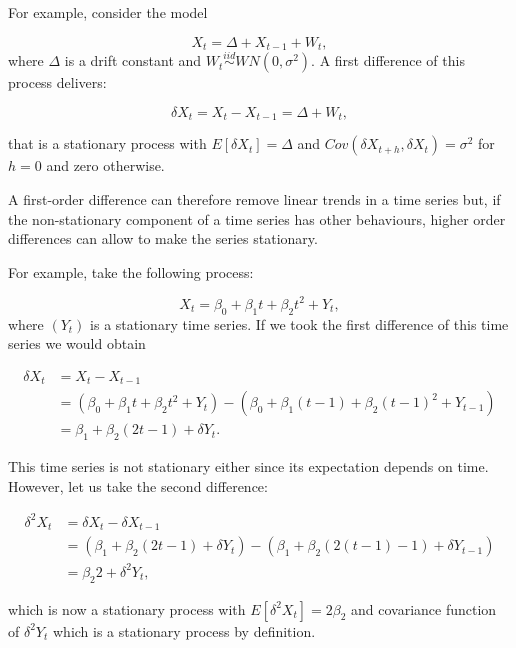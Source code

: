 \documentclass[]{book}
\theoremstyle{definition}
\theoremstyle{definition}
\theoremstyle{definition}
\theoremstyle{remark}
\let\BeginKnitrBlock\begin \let\EndKnitrBlock\end
\begin{document}
\BeginKnitrBlock{example}
\protect\hypertarget{exm:unnamed-chunk-91}{}{\label{exm:unnamed-chunk-91}
}For example, consider the model

\[X_t = \Delta + X_{t-1} + W_t,\] where \(\Delta\) is a drift constant
and \(W_t \overset{iid}{\sim} WN(0, \sigma^2)\). A first difference of
this process delivers:

\[\delta X_t = X_t - X_{t-1} = \Delta + W_t,\]

that is a stationary process with \(E[\delta X_t] = \Delta\) and
\(Cov(\delta X_{t+h}, \delta X_t) = \sigma^2\) for \(h = 0\) and zero
otherwise.
\EndKnitrBlock{example}

A first-order difference can therefore remove linear trends in a time
series but, if the non-stationary component of a time series has other
behaviours, higher order differences can allow to make the series
stationary.

\BeginKnitrBlock{example}
\protect\hypertarget{exm:unnamed-chunk-92}{}{\label{exm:unnamed-chunk-92}
}For example, take the following process:

\[X_t = \beta_0 + \beta_1 t + \beta_2 t^2 + Y_t,\] where \((Y_t)\) is a
stationary time series. If we took the first difference of this time
series we would obtain

\begin{align*}
            \delta X_t &= X_t - X_{t-1}\\
            & = (\beta_0 + \beta_1 t + \beta_2 t^2 + Y_t) - (\beta_0 + \beta_1 (t-1) + \beta_2 (t-1)^2 + Y_{t-1}) \\
            & = \beta_1 + \beta_2 (2t - 1) + \delta Y_t .
\end{align*}

This time series is not stationary either since its expectation depends
on time. However, let us take the second difference:

\begin{align*}
            \delta^2 X_t &= \delta X_t - \delta X_{t-1}\\
            & = (\beta_1 + \beta_2 (2t - 1) + \delta Y_t) - (\beta_1 + \beta_2 (2(t-1) - 1) + \delta Y_{t-1}) \\
            & =  \beta_2 2 + \delta^2 Y_t,
\end{align*}

which is now a stationary process with \(E[\delta^2 X_t] = 2 \beta_2\)
and covariance function of \(\delta^2 Y_t\) which is a stationary
process by definition.
\EndKnitrBlock{example}
\end{document}
